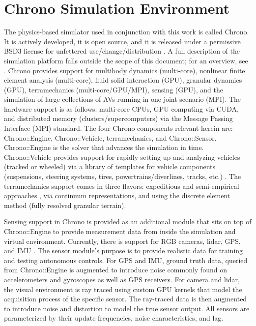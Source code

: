 
\section{Chrono Simulation Environment}
\label{sec:simEnv}
The physics-based simulator used in conjunction with this work is called Chrono. It is actively developed, it is open source, and it is released under a permissive BSD3 license for unfettered use/change/distribution \cite{projectChronoGithub}. A full description of the simulation platform falls outside the scope of this document; for an overview, see \cite{chronoOverview2016}. Chrono provides support for multibody dynamics (multi-core), nonlinear finite element analysis (multi-core), fluid solid interaction (GPU), granular dynamics (GPU), terramechanics (multi-core/GPU/MPI), sensing (GPU), and the simulation of large collections of AVs running in one joint scenario (MPI). The hardware support is as follows: multi-core CPUs, GPU computing via CUDA, and distributed memory (clusters/supercomputers) via the Message Passing Interface (MPI) standard. The four Chrono components relevant herein are: Chrono::Engine, Chrono::Vehicle, terramechanics, and Chrono::Sensor. Chrono::Engine is the solver that advances the simulation in time. Chrono::Vehicle provides support for rapidly setting up and analyzing vehicles (tracked or wheeled) via a library of templates for vehicle components (suspensions, steering systems, tires, powertrains/diverlines, tracks, etc.) \cite{ChronoVehicle2019}. The terramechanics support comes in three flavors: expeditious and semi-empirical approaches \cite{alessandroSCM2019}, via continuum representations, and using the discrete element method (fully resolved granular terrain).

Sensing support in Chrono is provided as an additional module that sits on top of Chrono::Engine to provide measurement data from inside the simulation and virtual environment. Currently, there is support for RGB cameras, lidar, GPS, and IMU \cite{TR-2020-07}. The sensor module's purpose is to provide realistic data for training and testing autonomous controls. For GPS and IMU, ground truth data, queried from Chrono::Engine is augmented to introduce noise commonly found on accelerometers and gyroscopes \cite{shah2018airsim} as well as GPS receivers. For camera and lidar, the visual environment is ray traced using custom GPU kernels that model the acquisition process of the specific sensor. The ray-traced data is then augmented to introduce noise and distortion to model the true sensor output. All sensors are parameterized by their update frequencies, noise characteristics, and lag. 

